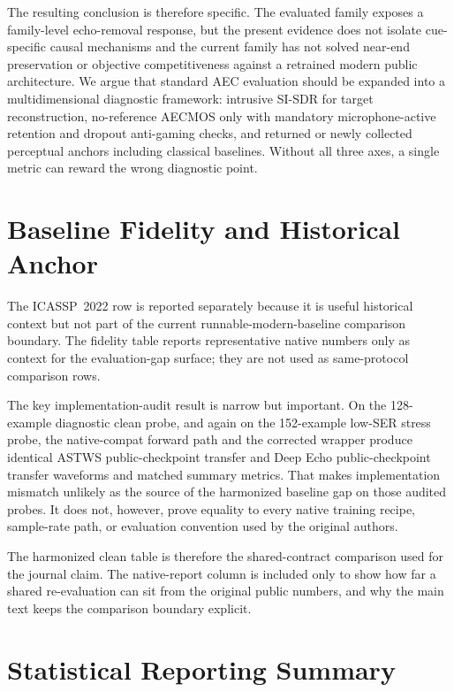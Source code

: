 \documentclass[journal]{IEEEtran}
\begin{document}
The resulting conclusion is therefore specific. The evaluated family exposes a family-level echo-removal response, but the present evidence does not isolate cue-specific causal mechanisms and the current family has not solved near-end preservation or objective competitiveness against a retrained modern public architecture. We argue that standard AEC evaluation should be expanded into a multidimensional diagnostic framework: intrusive SI-SDR for target reconstruction, no-reference AECMOS only with mandatory microphone-active retention and dropout anti-gaming checks, and returned or newly collected perceptual anchors including classical baselines. Without all three axes, a single metric can reward the wrong diagnostic point.

\appendices
\section{Baseline Fidelity and Historical Anchor}
\label{app:fidelity}




The ICASSP~2022 row is reported separately because it is useful historical context but not part of the current runnable-modern-baseline comparison boundary. The fidelity table reports representative native numbers only as context for the evaluation-gap surface; they are not used as same-protocol comparison rows.

The key implementation-audit result is narrow but important. On the 128-example diagnostic clean probe, and again on the 152-example low-SER stress probe, the native-compat forward path and the corrected wrapper produce identical ASTWS public-checkpoint transfer and Deep Echo public-checkpoint transfer waveforms and matched summary metrics. That makes implementation mismatch unlikely as the source of the harmonized baseline gap on those audited probes. It does not, however, prove equality to every native training recipe, sample-rate path, or evaluation convention used by the original authors.

The harmonized clean table is therefore the shared-contract comparison used for the journal claim. The native-report column is included only to show how far a shared re-evaluation can sit from the original public numbers, and why the main text keeps the comparison boundary explicit.

\section{Statistical Reporting Summary}
\label{app:stats}

\end{document}
